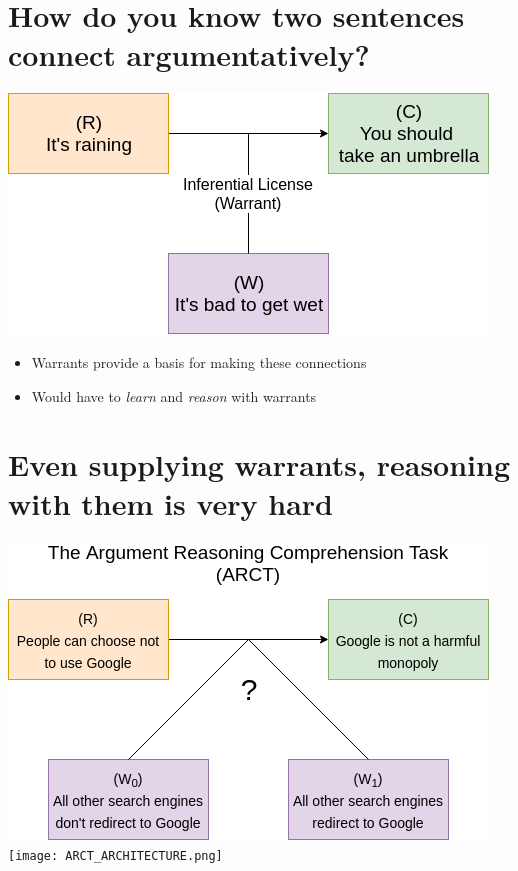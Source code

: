 \documentclass[a0,portrait]{a0poster}
\begin{document}
\vspace{1cm} %


\begin{multicols}{2} %

\large

\section*{How do you know two sentences connect argumentatively?}

\vspace{8pt}

\begin{center}
  \includegraphics[width=0.5\linewidth]{rain-umbrella-single.png}
\end{center}

\vspace{8pt}

\begin{itemize}
    \item Warrants provide a basis for making these connections
    \item Would have to \textit{learn} and \textit{reason} with warrants
\end{itemize}

\section*{Even supplying warrants, reasoning with them is very hard}

\vspace{8pt}

\begin{center}
  \includegraphics[width=0.45\linewidth]{google.png}
  \hspace*{0.09\linewidth}
  \texttt{[image: ARCT\_ARCHITECTURE.png]}
\end{center}


\end{multicols}
\end{document}
